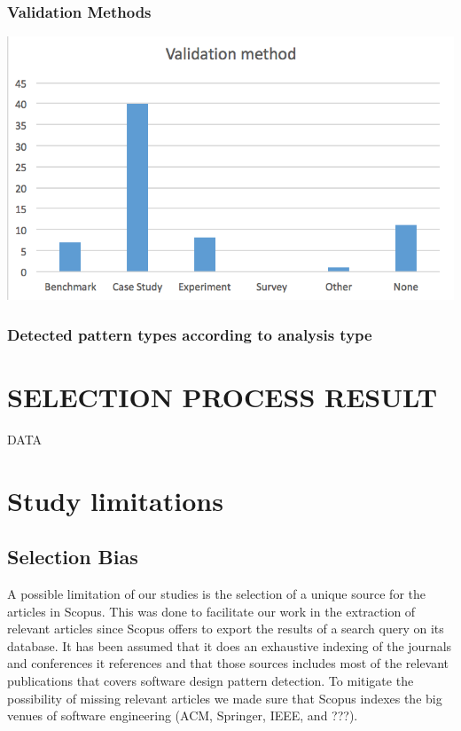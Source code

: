 \documentclass[letterpaper, 10 pt, conference]{ieeeconf}  %
\begin{document}
\subsubsection{Validation Methods}

\begin{center}
\includegraphics[scale=0.75]{validation_method.png}
\end{center}


\subsubsection{Detected pattern types according to analysis type}













\section{SELECTION PROCESS RESULT}

DATA

\section{Study limitations}

\subsection{Selection Bias}

A possible limitation of our studies is the selection of a unique source for 
the articles in Scopus.
This was done to facilitate our work in the extraction of relevant articles
since Scopus offers to export the results of a search query on its database.
It has been assumed that it does an exhaustive indexing of the journals
and conferences it references and that those sources includes most of the
relevant publications that covers software design pattern detection.
To mitigate the possibility of missing relevant articles we made sure that
Scopus indexes the big venues of software engineering (ACM, Springer, IEEE, and
???).
\end{document}
